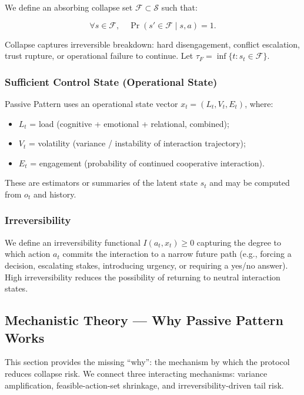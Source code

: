 We define an absorbing collapse set $\mathcal{F} \subset \mathcal{S}$
such that:

\begin{equation}
\forall s \in \mathcal{F},\quad
\Pr(s' \in \mathcal{F} \mid s, a) = 1.
\label{eq:pp-absorbing}
\end{equation}

Collapse captures irreversible breakdown: hard disengagement,
conflict escalation, trust rupture, or operational failure to
continue. Let $\tau_F = \inf\{t : s_t \in \mathcal{F}\}$.

\subsubsection{Sufficient Control State (Operational State)}
\label{sec:pp-control-state}

Passive Pattern uses an operational state vector $x_t = (L_t, V_t,
E_t)$, where:

\begin{itemize}
\item $L_t$ = load (cognitive + emotional + relational, combined);
\item $V_t$ = volatility (variance / instability of interaction
trajectory);
\item $E_t$ = engagement (probability of continued cooperative
interaction).
\end{itemize}

\noindent
These are estimators or summaries of the latent state $s_t$ and may
be computed from $o_t$ and history.

\subsubsection{Irreversibility}
\label{sec:pp-irreversibility}

We define an irreversibility functional $I(a_t, x_t) \ge 0$
capturing the degree to which action $a_t$ commits the interaction
to a narrow future path (e.g., forcing a decision, escalating
stakes, introducing urgency, or requiring a yes/no answer). High
irreversibility reduces the possibility of returning to neutral
interaction states.

\subsection{Mechanistic Theory --- Why Passive Pattern Works}
\label{sec:pp-mechanistic-theory}

This section provides the missing ``why'': the mechanism by which
the protocol reduces collapse risk. We connect three interacting
mechanisms: variance amplification, feasible-action-set shrinkage,
and irreversibility-driven tail risk.

